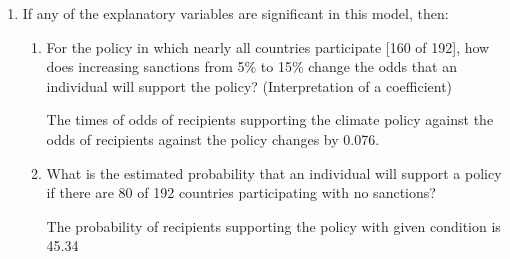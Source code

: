 \documentclass[12pt,letterpaper]{article}
\begin{document}
\begin{enumerate}
	\item
	If any of the explanatory variables are significant in this model, then:
	\begin{enumerate}
		\item
		For the policy in which nearly all countries participate [160 of 192], how does increasing sanctions from 5\% to 15\% change the odds that an individual will support the policy? (Interpretation of a coefficient)
        
        The times of odds of recipients supporting the climate policy against the odds of recipients against the policy changes by 0.076. 
		\item
		What is the estimated probability that an individual will support a policy if there are 80 of 192 countries participating with no sanctions? 
		
		
		The probability of recipients supporting the policy with given condition is 45.34%
		

\end{enumerate}
\end{enumerate}
\end{document}
